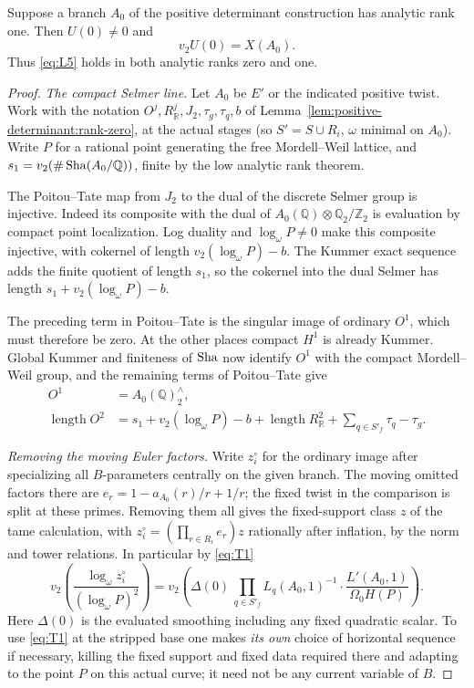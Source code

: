 \begin{lemma}\label{lem:positive-completion:rank-one}
Suppose a branch \(A_0\) of the positive determinant construction has analytic
rank one. Then \(U(0)\ne0\) and
\[
                         v_2 U(0)=X(A_0).
\]
Thus \eqref{eq:L5} holds in both analytic ranks zero and one.
\end{lemma}
\begin{proof}
\emph{The compact Selmer line.}
Let \(A_0\) be \(E'\) or the indicated positive twist. Work with the notation \(O^j,R^j_\mathbb R,J_2,\tau_g,\tau_q,b\) of Lemma~\ref{lem:positive-determinant:rank-zero}, at the actual stages (so \(S'=S\cup R_i\), \(\omega\) minimal on \(A_0\)). Write \(P\) for a rational point generating the free Mordell--Weil lattice, and \(s_1=v_2(\#\operatorname{Sha}(A_0/\mathbb Q))\), finite by the low analytic rank theorem.

The Poitou--Tate map from \(J_2\) to the dual of the discrete Selmer
group is injective. Indeed its composite with the dual of
\(A_0(\mathbb Q)\otimes\mathbb Q_2/\mathbb Z_2\) is evaluation by
compact point localization. Log duality and \(\log_\omega P\ne0\)
make this composite injective, with cokernel of length
\(v_2(\log_\omega P)-b\). The Kummer exact sequence adds the finite
quotient of length \(s_1\), so the cokernel into the dual Selmer has
length \(s_1+v_2(\log_\omega P)-b\).

The preceding term in Poitou--Tate is the singular image of ordinary
\(O^1\), which must therefore be zero. At the other places compact
\(H^1\) is already Kummer. Global Kummer and finiteness of \(\operatorname{Sha}\)
now identify \(O^1\) with the compact Mordell--Weil group, and the
remaining terms of Poitou--Tate give
\[
 \begin{split}
     O^1&= A_0(\mathbb Q)^\wedge_2,\\
     \operatorname{length} O^2&=s_1+v_2(\log_\omega P)-b+
                \operatorname{length}R^2_\mathbb R+
                         \sum_{q\in S'_f}\tau_q-\tau_g .
 \end{split}
\]

\emph{Removing the moving Euler factors.}
Write \(z^{\circ}_i\) for the ordinary image after specializing all \(B\)-parameters centrally on the given branch. The moving omitted factors there are \(e_r=1-a_{A_0}(r)/r+1/r\); the fixed twist in the comparison is split at these primes. Removing them all gives the fixed-support class \(z\) of the tame calculation, with
\(z^{\circ}_i=(\prod_{r\in R_i}e_r)z\) rationally after inflation, by the norm and tower relations. In particular by \eqref{eq:T1}
\[
 v_2\!\left(\frac{\log_\omega z^{\circ}_i}{(\log_\omega P)^2}\right)
  =v_2\!\left(\Delta(0)\,\prod_{q\in S'_f}L_q(A_0,1)^{-1}\cdot
              \frac{L'(A_0,1)}{\Omega_0 H(P)}\right).               \tag{P1}\label{eq:P1}
\]
Here \(\Delta(0)\) is the evaluated smoothing including any fixed quadratic scalar. To use \eqref{eq:T1} at the stripped base one makes \emph{its own} choice of horizontal sequence if necessary, killing the fixed support and fixed data required there and adapting to the point \(P\) on this actual curve; it need not be any current variable of \(B\).


\end{proof}
